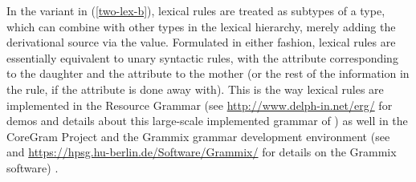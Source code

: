 \documentclass[output=paper
	        ,collection
	        ,collectionchapter
 	        ,biblatex
                ,babelshorthands
                ,newtxmath
                ,draftmode
                ,colorlinks, citecolor=brown
]{langscibook}
\begin{document}
\begin{exe}
\ex \label{two-lex}
\begin{xlist}
\ex \label{two-lex-a}
\ex \label{two-lex-b}
\end{xlist}
\end{exe}



In the variant in (\ref{two-lex-b}), lexical rules are treated as subtypes of a   type, which can combine with other types in the lexical hierarchy, merely adding the derivational source via the  value. 
Formulated in either fashion, lexical rules are essentially equivalent to unary syntactic rules, with the  attribute corresponding to the daughter and the  attribute to the mother (or the rest of the information in the rule, if the  attribute is done away with). This is the way lexical rules are implemented in the  Resource Grammar (see \url{http://www.delph-in.net/erg/} for demos and details about this large-scale implemented grammar of ) as well in the CoreGram Project and the Grammix grammar development environment  (see \citealt{MuellerGrammix} and \url{https://hpsg.hu-berlin.de/Software/Grammix/} for details on the Grammix software) .
\end{document}
